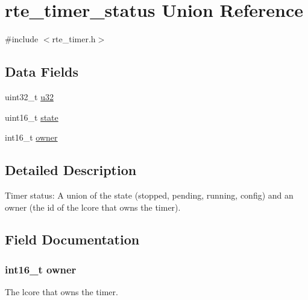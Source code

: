\hypertarget{unionrte__timer__status}{}\section{rte\+\_\+timer\+\_\+status Union Reference}
\label{unionrte__timer__status}


{\ttfamily \#include $<$rte\+\_\+timer.\+h$>$}

\subsection*{Data Fields}
\begin{DoxyCompactItemize}
\item 
uint32\+\_\+t \hyperlink{unionrte__timer__status_ae65af0c4a8ee050043fe4b575f0a26a0}{u32}
\item 
uint16\+\_\+t \hyperlink{unionrte__timer__status_af4ea525e6f15623e4e9c6c6aa75f2077}{state}
\item 
int16\+\_\+t \hyperlink{unionrte__timer__status_a511dc0fbddf046e2f2b2b5480188fcfb}{owner}
\end{DoxyCompactItemize}


\subsection{Detailed Description}
Timer status\+: A union of the state (stopped, pending, running, config) and an owner (the id of the lcore that owns the timer). 

\subsection{Field Documentation}
\hypertarget{unionrte__timer__status_a511dc0fbddf046e2f2b2b5480188fcfb}{}
\subsubsection[{owner}]{\setlength{\rightskip}{0pt plus 5cm}int16\+\_\+t owner}\label{unionrte__timer__status_a511dc0fbddf046e2f2b2b5480188fcfb}
The lcore that owns the timer. \hypertarget{unionrte__timer__status_af4ea525e6f15623e4e9c6c6aa75f2077}{}
